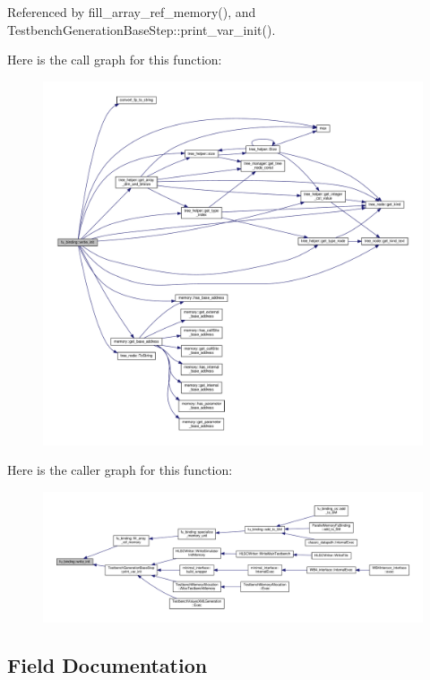 Referenced by fill\+\_\+array\+\_\+ref\+\_\+memory(), and Testbench\+Generation\+Base\+Step\+::print\+\_\+var\+\_\+init().

Here is the call graph for this function\+:
\nopagebreak
\begin{figure}[H]
\begin{center}
\leavevmode
\includegraphics[width=350pt]{d8/d04/classfu__binding_adf23b4232428cdc1ecb9247926b58a2e_cgraph}
\end{center}
\end{figure}
Here is the caller graph for this function\+:
\nopagebreak
\begin{figure}[H]
\begin{center}
\leavevmode
\includegraphics[width=350pt]{d8/d04/classfu__binding_adf23b4232428cdc1ecb9247926b58a2e_icgraph}
\end{center}
\end{figure}


\subsection{Field Documentation}
\mbox{\label{classfu__binding_a35118a88e4276cf592c1e63a96716ac9}} 

